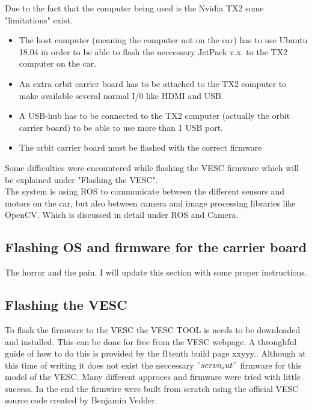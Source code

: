 \documentclass{article}
\begin{document}
	Due to the fact that the computer being used is the Nvidia TX2 some "limitations" exist. 

		\begin{itemize} 

			\item The host computer (meaning the computer not on the car) has to use Ubuntu 18.04 in order to be able to flash the neccessary JetPack v.x. to the TX2 computer on the car.
	
			\item
				An extra orbit carrier board has to be attached to the TX2 computer to make available several normal I/0 like HDMI and USB.

			\item
				A USB-hub has to be connected to the TX2 computer (actually the orbit carrier board) to be able to use more than 1 USB port.

			\item The orbit carrier board must be flashed with the correct firmware

		\end{itemize}

	 Some difficulties were encountered while flashing the VESC firmware which will be explained under "Flashing the VESC". \\ 

	The system is using ROS to communicate between the different sensors and motors on the car, but also between camera and image processing libraries like OpenCV. Which is discussed in detail under ROS and Camera.

	\subsection{Flashing OS and firmware for the carrier board}
		The horror and the pain. I will update this section with some proper instructions.

	\subsection{Flashing the VESC}
		To flash the firmware to the VESC the VESC TOOL is needs to be downloaded and installed. This can be done for free from the VESC webpage. A throughful guide of how to do this is provided by the f1tenth build page xxyyy.. Although at this time of writing it does not exist the neccessary $"servo_out"$ firmware for this model of the VESC. Many different approces and firmware were tried with little success. In the end the firmwire were built from scratch using the official VESC source code created by Benjamin Vedder.\\
\end{document}

